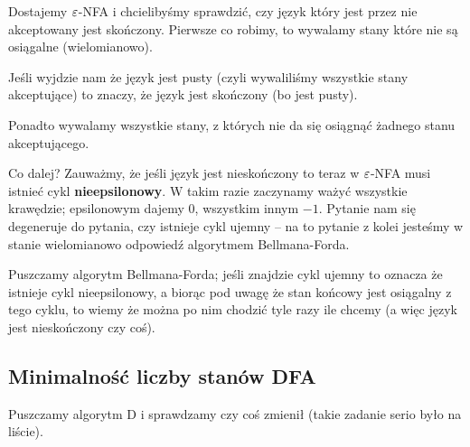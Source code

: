 Dostajemy \(\varepsilon\)-NFA i chcielibyśmy sprawdzić, czy język który jest przez nie akceptowany jest skończony. Pierwsze co robimy, to wywalamy stany które nie są osiągalne (wielomianowo). 

Jeśli wyjdzie nam że język jest pusty (czyli wywaliliśmy wszystkie stany akceptujące) to znaczy, że język jest skończony (bo jest pusty).

Ponadto wywalamy wszystkie stany, z których nie da się osiągnąć żadnego stanu akceptującego. 

Co dalej? Zauważmy, że jeśli język jest nieskończony to teraz w \(\varepsilon\)-NFA musi istnieć cykl \textbf{nieepsilonowy}. W takim razie zaczynamy ważyć wszystkie krawędzie; epsilonowym dajemy \(0\), wszystkim innym \(-1\). Pytanie nam się degeneruje do pytania, czy istnieje cykl ujemny -- na to pytanie z kolei jesteśmy w stanie wielomianowo odpowiedź algorytmem Bellmana-Forda. 

Puszczamy algorytm Bellmana-Forda; jeśli znajdzie cykl ujemny to oznacza że istnieje cykl nieepsilonowy, a biorąc pod uwagę że stan końcowy jest osiągalny z tego cyklu, to wiemy że można po nim chodzić tyle razy ile chcemy (a więc język jest nieskończony czy coś). 

\subsection{Minimalność liczby stanów DFA}

Puszczamy algorytm D i sprawdzamy czy coś zmienił (takie zadanie serio było na liście). 